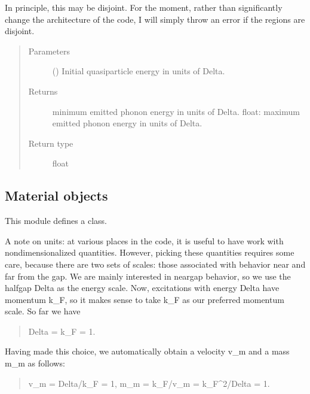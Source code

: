 \documentclass[letterpaper,10pt,english]{sphinxmanual}
\begin{document}
\begin{fulllineitems}
\begin{fulllineitems}
In principle, this may be disjoint. For the moment, rather than
significantly change the architecture of the code, I will simply throw
an error if the regions are disjoint.
\begin{quote}\begin{description}
\item[{Parameters}] \leavevmode
{} () \textendash{} Initial quasiparticle energy in units of Delta.

\item[{Returns}] \leavevmode
minimum emitted phonon energy in units of Delta.
float: maximum emitted phonon energy in units of Delta.

\item[{Return type}] \leavevmode
float

\end{description}\end{quote}

\end{fulllineitems}


\end{fulllineitems}



\subsection{Material objects}
\label{\detokenize{code_structure:module-scdc.material}}\label{\detokenize{code_structure:material-objects}}
This module defines a  class.

A note on units: at various places in the code, it is useful to have work with
non\sphinxhyphen{}dimensionalized quantities. However, picking these quantities requires
some care, because there are two sets of scales: those associated with
behavior near and far from the gap. We are mainly interested in near\sphinxhyphen{}gap
behavior, so we use the half\sphinxhyphen{}gap Delta as the energy scale. Now, excitations
with energy Delta have momentum k\_F, so it makes sense to take k\_F as our
preferred momentum scale. So far we have
\begin{quote}

Delta = k\_F = 1.
\end{quote}

Having made this choice, we automatically obtain a velocity v\_m and a mass m\_m
as follows:
\begin{quote}

v\_m = Delta/k\_F = 1,
m\_m = k\_F/v\_m = k\_F\textasciicircum{}2/Delta = 1.
\end{quote}
\end{document}
